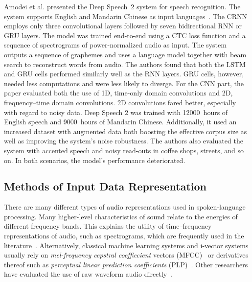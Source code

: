 Amodei et al. presented the Deep Speech~2 system for speech recognition. The system supports English and Mandarin Chinese as input languages~\cite{amodei2015deep}. The CRNN employs only three convolutional layers followed by seven bidirectional RNN or GRU layers. The model was trained end-to-end using a CTC loss function and a sequence of spectrograms of power-normalized audio as input. The system outputs a sequence of graphemes and uses a language model together with beam search to reconstruct words from audio. The authors found that both the LSTM and GRU cells performed similarly well as the RNN layers. GRU cells, however, needed less computations and were less likely to diverge. For the CNN part, the paper evaluated both the use of 1D, time-only domain convolutions and 2D, frequency--time domain convolutions. 2D convolutions fared better, especially with regard to noisy data.
Deep Speech 2 was trained with \num{12000}~hours of English speech and \num{9000}~hours of Mandarin Chinese. Additionally, it used an increased dataset with augmented data both boosting the effective corpus size as well as improving the system's noise robustness. The authors also evaluated the system with accented speech and noisy read-outs in coffee shops, streets, and so on. In both scenarios, the model's performance deteriorated.

\subsection{Methods of Input Data Representation}
There are many different types of audio representations used in spoken-language processing. Many higher-level characteristics of sound relate to the energies of different frequency bands. This explains the utility of time--frequency representations of audio, such as spectrograms, which are frequently used in the literature~\cite{montavon2009deep, dieleman2013multiscale, lee2009unsupervised, wulfing2012unsupervised, henaff2011unsupervised}. Alternatively, classical machine learning systems and i-vector systems usually rely on \emph{mel-frequency cepstral coeffiecient} vectors (MFCC)~\cite{richardson2015unified, dehak2011front, garcia2011analysis} or derivatives thereof such as \emph{perceptual linear prediction coefficients} (PLP)~\cite{gonzalez2014automatic}. Other researchers have evaluated the use of raw waveform audio directly~\cite{dieleman2014end, collobert2016wav2letter}.

